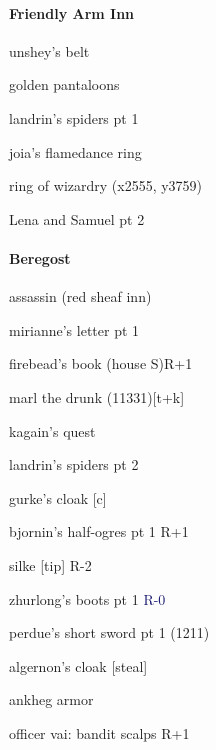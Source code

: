 \documentclass[10pt,a4,twoside]{book}
\begin{document}
\begin{multicols}{3}
\paragraph*{Friendly Arm Inn}
\begin{trivlist}
\item unshey's belt  \label{belt} %
\item golden pantaloons  \label{pants} %
\item landrin's spiders pt 1  \label{landrin} %
\item joia's flamedance ring
\item ring of wizardry (x2555, y3759)
\item Lena and Samuel pt 2   \label{gellana} %
\end{trivlist}

\paragraph*{Beregost}
\begin{trivlist}
\item assassin (red sheaf inn)
\item mirianne's letter pt 1   \label{mirianne} %
\item firebead's book (house S){\textcolor{OliveGreen}{R+1}}
\item marl the drunk (11331)[t+k] %
\item kagain's quest
\item landrin's spiders pt 2  \label{spiders} %
\item gurke's cloak [c]   \label{gurke} %
\item bjornin's half-ogres pt 1 {\textcolor{OliveGreen}{R+1}}   \label{bjornin} %
\item silke [tip] \textcolor{Mahogany}{R-2}
\item zhurlong's boots pt 1 \textcolor{MidnightBlue}{R-0}  \label{zhurlong} %
\item perdue's short sword pt 1 (1211)   \label{perdue} %
\item algernon's cloak [steal]  \label{algernon} %
\item ankheg armor
\item officer vai: bandit scalps {\textcolor{OliveGreen}{R+1}}
\end{trivlist}


\end{multicols}
\end{document}
